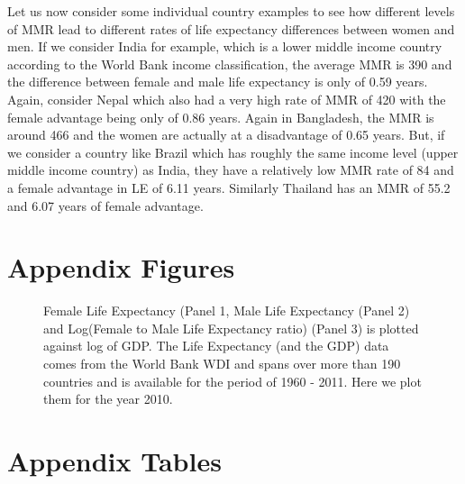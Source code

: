 \documentclass[11pt]{article}
\begin{document}
\begin{spacing}{1.4}

Let us now consider some individual country examples to see how different levels of MMR lead to different rates of life expectancy differences between women and men. If we consider India for example, which is a lower middle income country according to the World Bank income classification, the average MMR is 390 and the difference between female and male life expectancy is only of  0.59 years. Again, consider Nepal which also had a very high rate of MMR of 420 with the female advantage being only of 0.86 years. Again in Bangladesh, the MMR is around 466 and the women are actually at a disadvantage of 0.65 years. But, if we consider a country like Brazil which has roughly the same income level (upper middle income country) as India, they have a relatively low MMR rate of 84 and a female advantage in LE of 6.11 years. Similarly Thailand has an MMR of 55.2 and 6.07 years of female advantage. 


\newpage
\section{Appendix Figures}
\begin{figure}[h!]
\centering
{}
\caption{Female Life Expectancy (Panel 1, Male Life Expectancy (Panel 2) and Log(Female to Male Life Expectancy ratio) (Panel 3) is plotted against log of GDP. The Life Expectancy (and the GDP) data comes from the World Bank WDI and spans over more than 190 countries and is available for the period of 1960 - 2011. Here we plot them for the year 2010. \label{ScatterFLE}}
\end{figure}

\newpage
\section{Appendix Tables}








\end{spacing}
\end{document}
